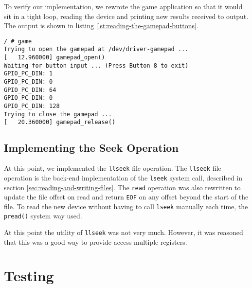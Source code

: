 To verify our implementation, we rewrote the game application so that it would sit in a tight loop, reading the device and printing new results received to output. The output is shown in listing \ref{lst:reading-the-gamepad-buttons}.
\begin{lstlisting}[caption=Reading the gamepad buttons,label=lst:reading-the-gamepad-buttons]
/ # game
Trying to open the gamepad at /dev/driver-gamepad ...
[   12.960000] gamepad_open()
Waiting for button input ... (Press Button 8 to exit)
GPIO_PC_DIN: 1
GPIO_PC_DIN: 0
GPIO_PC_DIN: 64
GPIO_PC_DIN: 0
GPIO_PC_DIN: 128
Trying to close the gamepad ...
[   20.360000] gamepad_release()
\end{lstlisting}

\subsection{Implementing the Seek Operation}
At this point, we implemented the \texttt{llseek} file operation. The \texttt{llseek} file operation is the back-end implementation of the \texttt{lseek} system call, described in section \ref{sec:reading-and-writing-files}. The \texttt{read} operation was also rewritten to update the file offset on read and return \texttt{EOF} on any offset beyond the start of the file. To read the new device without having to call \texttt{lseek} manually each time, the \texttt{pread()} system way used. 

At this point the utility of \texttt{llseek} was not very much. However, it was reasoned that this was a good way to provide access multiple registers.



\section{Testing}
